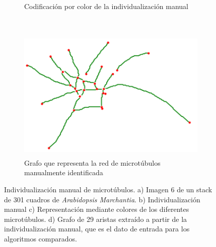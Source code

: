 \begin{figure}[h!]
\begin{subfigure}[t]{0.49\textwidth}
        \caption{Codificaci\'on por color de la individualizaci\'on manual}
        \label{fig:SpinningMarchantia-indivManual}
    \end{subfigure}
    ~
    \begin{subfigure}[t]{0.49\textwidth}
        \centering
        \includegraphics[height=2.5in]{benchImages/50-ROIs-Spinning-Marchantia-graph-og.png}
        \caption{Grafo que representa la red de microt\'ubulos manualmente identificada}
        \label{fig:SpinningMarchantia-graph}
    \end{subfigure}
    \caption{Individualizaci\'on manual de microt\'ubulos. a) Imagen 6 de un stack de 301 cuadros de {\it Arabidopsis Marchantia}. b) Individualizaci\'on manual c) Representaci\'on mediante colores de los diferentes microt\'ubulos. d) Grafo de 29 aristas extra\'ido a partir de la individualizaci\'on manual, que es el dato de entrada para los algoritmos comparados.}
    \label{fig:SpinningMarchantia}
\end{figure}



